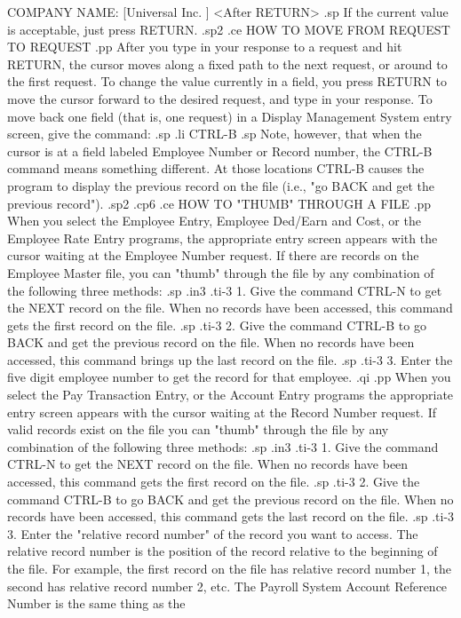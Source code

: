     COMPANY NAME: [Universal Inc.	       ]  <After RETURN>
.sp
If the current value is acceptable, just press RETURN.
.sp2
.ce
HOW TO MOVE FROM REQUEST TO REQUEST
.pp
After you type in your response to a request and hit RETURN, the
cursor moves along a fixed path to the next request, or around
to the first request.  To change
the value currently in a field, you press RETURN to move the cursor
forward to the desired request, and type in your response.  To move
back one field (that is, one request) in a Display Management
System entry screen,
give the command:
.sp
.li
		CTRL-B
.sp
Note, however, that when the cursor is at a field labeled Employee Number
or Record number, the CTRL-B command means something different.  At those
locations CTRL-B causes the program to display the previous record on the
file (i.e., "go BACK and get the previous record").
.sp2
.cp6
.ce
HOW TO "THUMB" THROUGH A FILE
.pp
When you select the Employee Entry, Employee Ded/Earn and Cost, or the
Employee Rate Entry programs, the appropriate entry screen appears with
the cursor waiting at the Employee Number request.  If there are records
on the Employee Master file, you can "thumb" through the file by any
combination of the following three methods:
.sp
.in3
.ti-3
1. Give the command CTRL-N to get the NEXT record on the file.	When
no records have been accessed, this command gets the first record on the
file.
.sp
.ti-3
2. Give the command CTRL-B to go BACK and get the previous record on the
file.  When no records have been accessed, this command brings up the last
record on the file.
.sp
.ti-3
3. Enter the five digit employee number to get the record for that employee.
.qi
.pp
When you select the Pay Transaction Entry, or the Account Entry programs
the appropriate entry screen appears with the cursor waiting at the
Record Number request.	If valid records exist on the file you can
"thumb" through the file by any combination of the following three
methods:
.sp
.in3
.ti-3
1. Give the command CTRL-N to get the NEXT record on the file.	When
no records have been accessed, this command gets the first record on
the file.
.sp
.ti-3
2. Give the command CTRL-B to go BACK and get the previous record on
the file.  When no records have been accessed, this command gets the
last record on the file.
.sp
.ti-3
3. Enter the "relative record number" of the record you want to access.
The relative record number is the position of the record relative to the
beginning of the file.	For example, the first record on the file has
relative record number 1, the second has relative record number 2, etc.
The Payroll System Account Reference Number is the same thing as the
